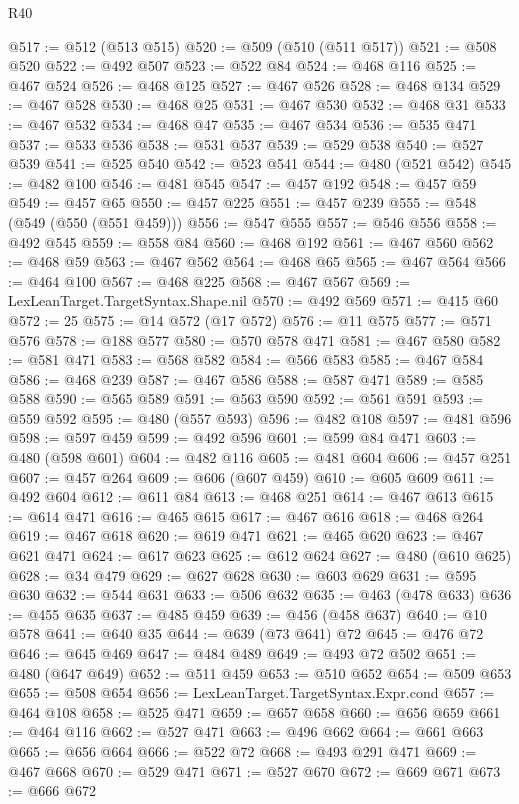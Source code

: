 \begin{lexlean}{R40}
\begin{coremodule}
{{{{{{{{{{{{{{{{{{{{{{{{{{{{{{{{{{{{{{{{{{{{{{{{{{{{{{{{{{{{{{{{{{{{{{{{{{{{{{{{{{{{{{{{{{{{{{{{{{{{{{{{{{{{{@517 := @512 (@513 @515)
@520 := @509 (@510 (@511 @517))
@521 := @508 @520
@522 := @492 @507
@523 := @522 @84
@524 := @468 @116
@525 := @467 @524
@526 := @468 @125
@527 := @467 @526
@528 := @468 @134
@529 := @467 @528
@530 := @468 @25
@531 := @467 @530
@532 := @468 @31
@533 := @467 @532
@534 := @468 @47
@535 := @467 @534
@536 := @535 @471
@537 := @533 @536
@538 := @531 @537
@539 := @529 @538
@540 := @527 @539
@541 := @525 @540
@542 := @523 @541
@544 := @480 (@521 @542)
@545 := @482 @100
@546 := @481 @545
@547 := @457 @192
@548 := @457 @59
@549 := @457 @65
@550 := @457 @225
@551 := @457 @239
@555 := @548 (@549 (@550 (@551 @459)))
@556 := @547 @555
@557 := @546 @556
@558 := @492 @545
@559 := @558 @84
@560 := @468 @192
@561 := @467 @560
@562 := @468 @59
@563 := @467 @562
@564 := @468 @65
@565 := @467 @564
@566 := @464 @100
@567 := @468 @225
@568 := @467 @567
@569 := LexLeanTarget.TargetSyntax.Shape.nil
@570 := @492 @569
@571 := @415 @60
@572 := 25
@575 := @14 @572 (@17 @572)
@576 := @11 @575
@577 := @571 @576
@578 := @188 @577
@580 := @570 @578 @471
@581 := @467 @580
@582 := @581 @471
@583 := @568 @582
@584 := @566 @583
@585 := @467 @584
@586 := @468 @239
@587 := @467 @586
@588 := @587 @471
@589 := @585 @588
@590 := @565 @589
@591 := @563 @590
@592 := @561 @591
@593 := @559 @592
@595 := @480 (@557 @593)
@596 := @482 @108
@597 := @481 @596
@598 := @597 @459
@599 := @492 @596
@601 := @599 @84 @471
@603 := @480 (@598 @601)
@604 := @482 @116
@605 := @481 @604
@606 := @457 @251
@607 := @457 @264
@609 := @606 (@607 @459)
@610 := @605 @609
@611 := @492 @604
@612 := @611 @84
@613 := @468 @251
@614 := @467 @613
@615 := @614 @471
@616 := @465 @615
@617 := @467 @616
@618 := @468 @264
@619 := @467 @618
@620 := @619 @471
@621 := @465 @620
@623 := @467 @621 @471
@624 := @617 @623
@625 := @612 @624
@627 := @480 (@610 @625)
@628 := @34 @479
@629 := @627 @628
@630 := @603 @629
@631 := @595 @630
@632 := @544 @631
@633 := @506 @632
@635 := @463 (@478 @633)
@636 := @455 @635
@637 := @485 @459
@639 := @456 (@458 @637)
@640 := @10 @578
@641 := @640 @35
@644 := @639 (@73 @641) @72
@645 := @476 @72
@646 := @645 @469
@647 := @484 @489
@649 := @493 @72 @502
@651 := @480 (@647 @649)
@652 := @511 @459
@653 := @510 @652
@654 := @509 @653
@655 := @508 @654
@656 := LexLeanTarget.TargetSyntax.Expr.cond
@657 := @464 @108
@658 := @525 @471
@659 := @657 @658
@660 := @656 @659
@661 := @464 @116
@662 := @527 @471
@663 := @496 @662
@664 := @661 @663
@665 := @656 @664
@666 := @522 @72
@668 := @493 @291 @471
@669 := @467 @668
@670 := @529 @471
@671 := @527 @670
@672 := @669 @671
@673 := @666 @672
}}}}}}}}}}}}}}}}}}}}}}}}}}}}}}}}}}}}}}}}}}}}}}}}}}}}}}}}}}}}}}}}}}}}}}}}}}}}}}}}}}}}}}}}}}}}}}}}}}}}}}}}}}}}}
\end{coremodule}
\end{lexlean}
